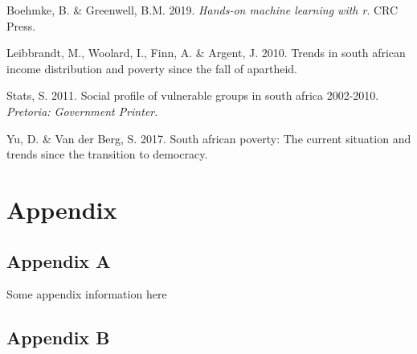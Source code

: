 \documentclass[11pt,preprint, authoryear]{elsarticle}
\numberwithin{equation}{section}
\numberwithin{figure}{section}
\numberwithin{table}{section}
\newlength{\cslhangindent}
\newenvironment{CSLReferences}%
  {\setlength{\parindent}{0pt}%
  \everypar{\setlength{\hangindent}{\cslhangindent}}\ignorespaces}%
  {\par}
\begin{document}
\hypertarget{refs}{}
\begin{CSLReferences}{1}{0}
\leavevmode\hypertarget{ref-boehmke2019hands}{}%
Boehmke, B. \& Greenwell, B.M. 2019. \emph{Hands-on machine learning
with r}. CRC Press.

\leavevmode\hypertarget{ref-leibbrandt2010trends}{}%
Leibbrandt, M., Woolard, I., Finn, A. \& Argent, J. 2010. Trends in
south african income distribution and poverty since the fall of
apartheid.

\leavevmode\hypertarget{ref-stats2011social}{}%
Stats, S. 2011. Social profile of vulnerable groups in south africa
2002-2010. \emph{Pretoria: Government Printer}.

\leavevmode\hypertarget{ref-vanderberg2017}{}%
Yu, D. \& Van der Berg, S. 2017. South african poverty: The current
situation and trends since the transition to democracy.

\end{CSLReferences}

\hypertarget{appendix}{%
\section*{Appendix}\label{appendix}}

\hypertarget{appendix-a}{%
\subsection*{Appendix A}\label{appendix-a}}

Some appendix information here

\hypertarget{appendix-b}{%
\subsection*{Appendix B}\label{appendix-b}}


\end{document}
